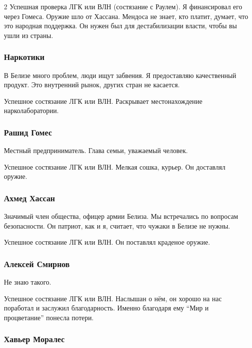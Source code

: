 \documentclass[twoside]{article}
\begin{document}
\begin{multicols}{2}
Успешная проверка ЛГК или ВЛН (состязание с Раулем). Я финансировал его через Гомеса. Оружие
шло от Хассана. Мендоса не знает, кто платит, думает, что это народная
поддержка. Он нужен был для дестабилизации власти, чтобы вы ушли из
страны.

\subsubsection{Наркотики}\label{narcotics-valdes}

В Белизе много проблем, люди ищут забвения. Я предоставляю качественный
продукт. Это внутренний рынок, других стран не касается.

Успешное состязание ЛГК или ВЛН. Раскрывает местонахождение
нарколаборатории.

\subsubsection{Рашид Гомес}\label{rashid-gomez-valdes}

Местный предприниматель. Глава семьи, уважаемый человек.

Успешное состязание ЛГК или ВЛН. Мелкая сошка, курьер. Он доставлял
оружие.

\subsubsection{Ахмед Хассан}\label{ahmed-hassan-valdes}

Значимый член общества, офицер армии Белиза. Мы встречались по вопросам
безопасности. Он патриот, как и я, считает, что чужаки в Белизе не
нужны.

Успешное состязание ЛГК или ВЛН. Он поставлял краденое оружие.

\subsubsection{Алексей Смирнов}\label{alexey-smirnov-valdes}

Не знаю такого.

Успешное состязание ЛГК или ВЛН. Наслышан о нём, он хорошо на нас
поработал и заслужил благодарность. Именно благодаря ему \enquote{Мир и
процветание} понесла потери.

\subsubsection{Хавьер Моралес}\label{javier-morales}


\end{multicols}
\end{document}

